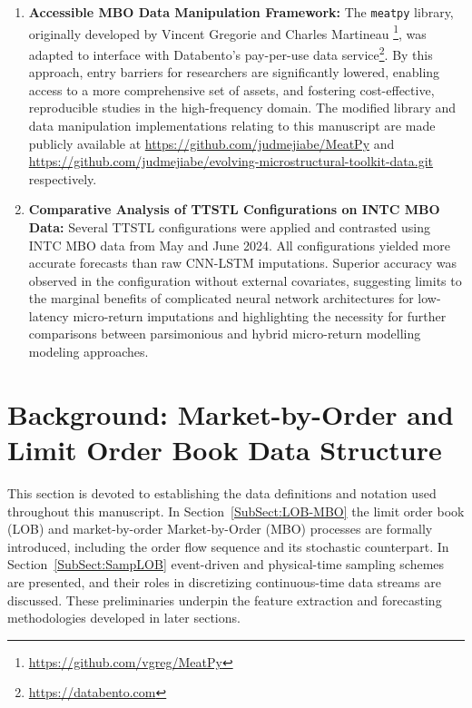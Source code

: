 \documentclass[10pt,a4paper,oneside]{article}
\providecommand{\DIFaddtex}[1]{{\protect\color{blue} \sf #1}} %
\providecommand{\DIFdeltex}[1]{{\protect\color{red} \scriptsize #1}} %
\providecommand{\DIFaddbegin}{} %
\providecommand{\DIFaddend}{} %
\providecommand{\DIFdelbegin}{} %
\providecommand{\DIFdelend}{} %
\providecommand{\DIFadd}[1]{\texorpdfstring{\DIFaddtex{#1}}{#1}} %
\providecommand{\DIFdel}[1]{\texorpdfstring{\DIFdeltex{#1}}{}} %
\newcommand{\DIFscaledelfig}{0.5}
\newlength{\DIFdelgraphicswidth} %
\newlength{\DIFdelgraphicsheight} %
\newcommand{\DIFaddincludegraphics}[2][]{{\color{blue}\fbox{\DIFOincludegraphics[#1]{#2}}}} %
\newcommand{\DIFdelincludegraphics}[2][]{%
\sbox{\DIFdelgraphicsbox}{\DIFOincludegraphics[#1]{#2}}%
\settoboxwidth{\DIFdelgraphicswidth}{\DIFdelgraphicsbox} %
\settoboxtotalheight{\DIFdelgraphicsheight}{\DIFdelgraphicsbox} %
\scalebox{\DIFscaledelfig}{%
\parbox[b]{\DIFdelgraphicswidth}{\usebox{\DIFdelgraphicsbox}\\[-\baselineskip] \rule{\DIFdelgraphicswidth}{0em}}\llap{\resizebox{\DIFdelgraphicswidth}{\DIFdelgraphicsheight}{%
\setlength{\unitlength}{\DIFdelgraphicswidth}%
\begin{picture}(1,1)%
\thicklines\linethickness{2pt} %
{\color[rgb]{1,0,0}\put(0,0){\framebox(1,1){}}}%
{\color[rgb]{1,0,0}\put(0,0){\line( 1,1){1}}}%
{\color[rgb]{1,0,0}\put(0,1){\line(1,-1){1}}}%
\end{picture}%
}\hspace*{3pt}}} %
} %
\DeclareRobustCommand{\DIFaddbegin}{\DIFOaddbegin \let\includegraphics\DIFaddincludegraphics} %
\DeclareRobustCommand{\DIFaddend}{\DIFOaddend \let\includegraphics\DIFOincludegraphics} %
\DeclareRobustCommand{\DIFdelbegin}{\DIFOdelbegin \let\includegraphics\DIFdelincludegraphics} %
\DeclareRobustCommand{\DIFdelend}{\DIFOaddend \let\includegraphics\DIFOincludegraphics} %
\begin{document}
\begin{enumerate}
    \item \textbf{Accessible MBO Data Manipulation Framework:} The \verb|meatpy| library, originally developed by Vincent Gregorie and Charles Martineau \footnote{\url{https://github.com/vgreg/MeatPy}}, was adapted to interface with Databento’s pay-per-use data service\footnote{\url{https://databento.com}}. By this approach, entry barriers for researchers are significantly lowered, enabling access to a more comprehensive set of assets, and fostering cost-effective, reproducible studies in the high-frequency domain. The modified library and data manipulation implementations relating to this manuscript are made publicly available at \url{https://github.com/judmejiabe/MeatPy} and \url{https://github.com/judmejiabe/evolving-microstructural-toolkit-data.git} respectively.

    \item \textbf{Comparative Analysis of TTSTL Configurations on INTC MBO Data:} Several TTSTL configurations were applied and contrasted using INTC MBO data from May and June 2024. All configurations yielded more accurate forecasts than raw CNN-LSTM imputations. Superior accuracy was observed in the configuration without external covariates, suggesting limits to the marginal benefits of complicated neural network architectures for low-latency micro-return imputations and highlighting the necessity for further comparisons between parsimonious and hybrid micro-return \DIFdelbegin \DIFdel{modelling }\DIFdelend \DIFaddbegin \DIFadd{modeling }\DIFaddend approaches.
\end{enumerate}


\section{Background: Market-by-Order and Limit Order Book Data Structure}
\label{Sect:BckGrnd}
\DIFdelbegin %

\DIFdelend %
This section is devoted to establishing the data definitions and notation used throughout this manuscript.  In Section~\ref{SubSect:LOB-MBO} the limit order book (LOB) and \DIFdelbegin \DIFdel{market-by-order }\DIFdelend \DIFaddbegin \DIFadd{Market-by-Order }\DIFaddend (MBO) processes are formally introduced, including the order flow sequence and its stochastic counterpart.  In Section~\ref{SubSect:SampLOB} event-driven and physical-time sampling schemes are presented, and their roles in discretizing continuous-time data streams are discussed.  These preliminaries underpin the feature extraction and forecasting methodologies developed in later sections.
\end{document}
